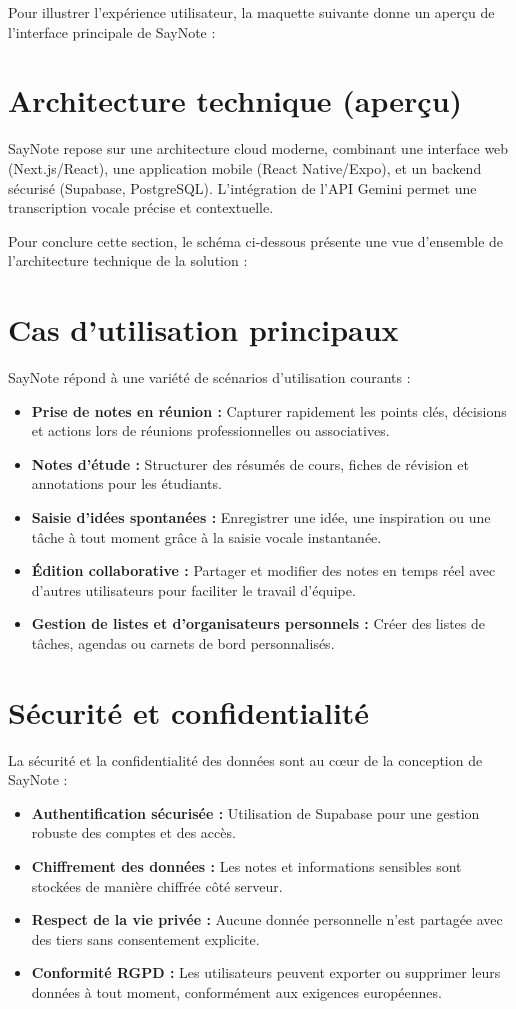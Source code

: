 Pour illustrer l’expérience utilisateur, la maquette suivante donne un aperçu de l’interface principale de SayNote :

\section{Architecture technique (aperçu)}
SayNote repose sur une architecture cloud moderne, combinant une interface web (Next.js/React), une application mobile (React Native/Expo), et un backend sécurisé (Supabase, PostgreSQL). L’intégration de l’API Gemini permet une transcription vocale précise et contextuelle.

Pour conclure cette section, le schéma ci-dessous présente une vue d’ensemble de l’architecture technique de la solution :



\section{Cas d’utilisation principaux}
SayNote répond à une variété de scénarios d’utilisation courants :
\begin{itemize}
    \item \textbf{Prise de notes en réunion :} Capturer rapidement les points clés, décisions et actions lors de réunions professionnelles ou associatives.
    \item \textbf{Notes d’étude :} Structurer des résumés de cours, fiches de révision et annotations pour les étudiants.
    \item \textbf{Saisie d’idées spontanées :} Enregistrer une idée, une inspiration ou une tâche à tout moment grâce à la saisie vocale instantanée.
    \item \textbf{Édition collaborative :} Partager et modifier des notes en temps réel avec d’autres utilisateurs pour faciliter le travail d’équipe.
    \item \textbf{Gestion de listes et d’organisateurs personnels :} Créer des listes de tâches, agendas ou carnets de bord personnalisés.
\end{itemize}

\section{Sécurité et confidentialité}
La sécurité et la confidentialité des données sont au cœur de la conception de SayNote :
\begin{itemize}
    \item \textbf{Authentification sécurisée :} Utilisation de Supabase pour une gestion robuste des comptes et des accès.
    \item \textbf{Chiffrement des données :} Les notes et informations sensibles sont stockées de manière chiffrée côté serveur.
    \item \textbf{Respect de la vie privée :} Aucune donnée personnelle n’est partagée avec des tiers sans consentement explicite.
    \item \textbf{Conformité RGPD :} Les utilisateurs peuvent exporter ou supprimer leurs données à tout moment, conformément aux exigences européennes.
\end{itemize}

